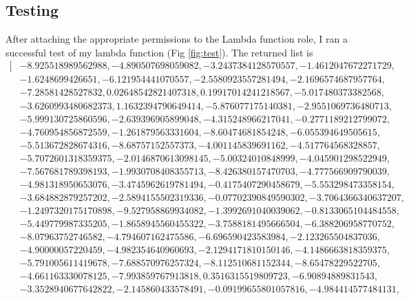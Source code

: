 \documentclass[11pt]{amsart}
\begin{document}
\subsection{Testing}
After attaching the appropriate permissions to the Lambda function role, I ran a successful test of my lambda function (Fig \ref{fig:test}). The returned list is 
{\small
\begin{align*}
[&-8.925518989562988, -4.890507698059082, -3.2437384128570557, -1.4612047672271729, \\
&-1.6248699426651, -6.121954441070557, -2.5580923557281494, -2.1696574687957764,\\&
 -7.28581428527832, 0.02648542821407318,  0.19917014241218567, -5.017480373382568,\\&
  -3.6260993480682373, 1.1632394790649414, -5.876077175140381, -2.9551069736480713, \\&
  -5.999130725860596, -2.639396905899048, -4.315248966217041, -0.2771189212799072, \\&
  -4.760954856872559, -1.261879563331604, -8.60474681854248, -6.055394649505615, \\&
  -5.513672828674316, -8.68757152557373, -4.001145839691162, -4.517764568328857, \\&
  -5.7072601318359375, -2.0146870613098145, -5.00324010848999, -4.045901298522949, \\&
  -7.567681789398193, -1.9930708408355713, -8.426380157470703, -4.777566909790039, \\&
  -4.981318950653076, -3.4745962619781494, -0.4175407290458679, -5.553298473358154, \\&
  -3.684882879257202, -2.5894155502319336, -0.07702390849590302, -3.7064366340637207,\\&
   -1.2497320175170898, -9.527958869934082, -1.3992691040039062, -0.8133065104484558,\\&
    -5.449779987335205, -1.8658945560455322, -3.7588181495666504, -6.388206958770752, \\&
    -8.07963752746582, -4.794607162475586, -6.696590423583984, -2.123265504837036, \\&
    -4.90000057220459, -4.982354640960693, -2.1294171810150146, -4.1486663818359375,\\&
     -5.791005611419678, -7.688570976257324, -8.112510681152344, -8.65478229522705, \\&
     -4.661163330078125, -7.993859767913818, 0.3516315519809723, -6.90894889831543,\\&
      -3.3528940677642822, -2.145860433578491, -0.09199655801057816, -4.984414577484131, \\&

\end{align*}}
\end{document}
